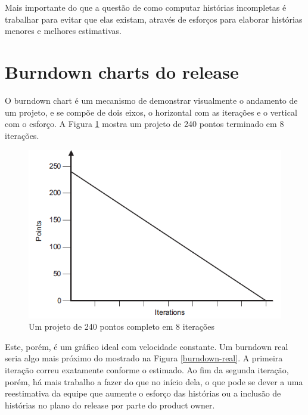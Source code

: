 \documentclass[a4paper,abntfigtabnum,noindentfirst]{abnt}
\begin{document}
Mais importante do que a questão de como computar histórias incompletas é trabalhar para evitar que elas existam, através de esforços para elaborar histórias menores e melhores estimativas.


\section{Burndown charts do release}

O burndown chart é um mecanismo de demonstrar visualmente o andamento de um projeto, e se compõe de dois eixos, o horizontal com as iterações e o vertical com o esforço. A Figura \ref{burndown-completo} mostra um projeto de 240 pontos terminado em 8 iterações.

\begin{figure}
  \caption{Um projeto de 240 pontos completo em 8 iterações}
  \label{burndown-completo}
  \begin{center}
  \includegraphics[scale=0.6]{burndown-completo}
  \end{center}
\end{figure}

Este, porém, é um gráfico ideal com velocidade constante. Um burndown real seria algo mais próximo do mostrado na Figura \ref{burndown-real}. A primeira iteração correu exatamente conforme o estimado. Ao fim da segunda iteração, porém, há mais trabalho a fazer do que no início dela, o que pode se dever a uma reestimativa da equipe que aumente o esforço das histórias ou a inclusão de histórias no plano do release por parte do product owner.
\end{document}
